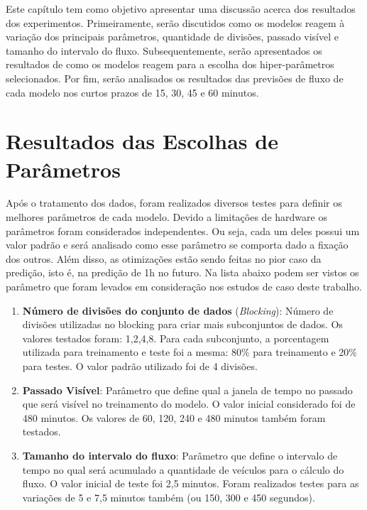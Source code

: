 





Este capítulo tem como objetivo apresentar uma discussão acerca dos resultados dos experimentos. Primeiramente, serão discutidos como os modelos reagem à variação dos principais parâmetros, quantidade de divisões, passado visível e tamanho do intervalo do fluxo. Subsequentemente, serão apresentados os resultados de como os modelos reagem para a escolha dos hiper-parâmetros selecionados. Por fim, serão analisados os resultados das previsões de fluxo de cada modelo nos curtos prazos de 15, 30, 45 e 60 minutos.

\section{Resultados das Escolhas de Parâmetros}

Após o tratamento dos dados, foram realizados diversos testes para definir os melhores parâmetros de cada modelo. Devido a limitações de hardware os parâmetros foram considerados independentes. Ou seja, cada um deles possui um valor padrão e será analisado como esse parâmetro se comporta dado a fixação dos outros. Além disso, as otimizações estão sendo feitas no pior caso da predição, isto é, na predição de 1h no futuro. Na lista abaixo podem ser vistos os parâmetro que foram levados em consideração nos estudos de caso deste trabalho.

\begin{enumerate}
	\item \textbf{Número de divisões do conjunto de dados} (\textit{Blocking}): Número de divisões utilizadas no blocking para criar mais subconjuntos de dados. Os valores testados foram: 1,2,4,8. Para cada subconjunto, a porcentagem utilizada para treinamento e teste foi a mesma: 80\% para treinamento e 20\% para testes. O valor padrão utilizado foi de 4 divisões.
	\item \textbf{Passado Visível}: Parâmetro que define qual a janela de tempo no passado que será visível no treinamento do modelo. O valor inicial considerado foi de 480 minutos. Os valores de 60, 120, 240 e 480 minutos também foram testados.
	\item \textbf{Tamanho do intervalo do fluxo}: Parâmetro que define o intervalo de tempo no qual será acumulado a quantidade de veículos para o cálculo do fluxo. O valor inicial de teste foi 2,5 minutos. Foram realizados testes para as variações de 5 e 7,5 minutos também (ou 150, 300 e 450 segundos).
\end{enumerate}

